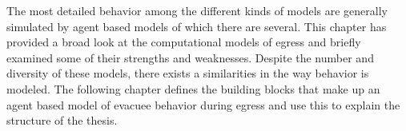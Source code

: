 The most detailed behavior among the different kinds of models are generally simulated by agent based models of which there are several. This chapter has provided a broad look at the computational models of egress and briefly examined some of their strengths and weaknesses. Despite the number and diversity of these models, there exists a similarities in the way behavior is modeled. The following chapter defines the building blocks that make up an agent based model of evacuee behavior during egress and use this to explain the structure of the thesis.


